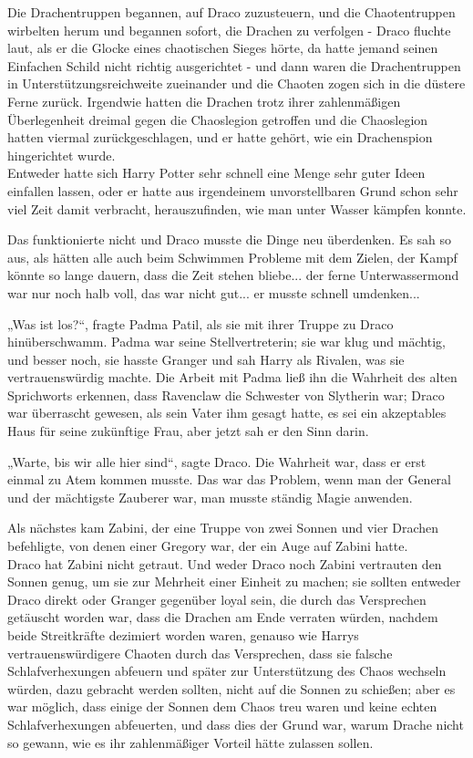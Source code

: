 {Die Drachentruppen begannen, auf Draco zuzusteuern, und die Chaotentruppen wirbelten herum und begannen sofort, die Drachen zu verfolgen - Draco fluchte laut, als er die Glocke eines chaotischen Sieges hörte, da hatte jemand seinen Einfachen Schild nicht richtig ausgerichtet - und dann waren die Drachentruppen in Unterstützungsreichweite zueinander und die Chaoten zogen sich in die düstere Ferne zurück. Irgendwie hatten die Drachen trotz ihrer zahlenmäßigen Überlegenheit dreimal gegen die Chaoslegion getroffen und die Chaoslegion hatten viermal zurückgeschlagen, und er hatte gehört, wie ein Drachenspion hingerichtet wurde.\\ Entweder hatte sich Harry Potter sehr schnell eine Menge sehr guter Ideen einfallen lassen, oder er hatte aus irgendeinem unvorstellbaren Grund schon sehr viel Zeit damit verbracht, herauszufinden, wie man unter Wasser kämpfen konnte.

Das funktionierte nicht und Draco musste die Dinge neu überdenken. Es sah so aus, als hätten alle auch beim Schwimmen Probleme mit dem Zielen, der Kampf könnte so lange dauern, dass die Zeit stehen bliebe... der ferne Unterwassermond war nur noch halb voll, das war nicht gut... er musste schnell umdenken...

„Was ist los?“, fragte Padma Patil, als sie mit ihrer Truppe zu Draco hinüberschwamm. Padma war seine Stellvertreterin; sie war klug und mächtig, und besser noch, sie hasste Granger und sah Harry als Rivalen, was sie vertrauenswürdig machte. Die Arbeit mit Padma ließ ihn die Wahrheit des alten Sprichworts erkennen, dass Ravenclaw die Schwester von Slytherin war; Draco war überrascht gewesen, als sein Vater ihm gesagt hatte, es sei ein akzeptables Haus für seine zukünftige Frau, aber jetzt sah er den Sinn darin.

„Warte, bis wir alle hier sind“, sagte Draco. Die Wahrheit war, dass er erst einmal zu Atem kommen musste. Das war das Problem, wenn man der General und der mächtigste Zauberer war, man musste ständig Magie anwenden.

Als nächstes kam Zabini, der eine Truppe von zwei Sonnen und vier Drachen befehligte, von denen einer Gregory war, der ein Auge auf Zabini hatte.\\ Draco hat Zabini nicht getraut. Und weder Draco noch Zabini vertrauten den Sonnen genug, um sie zur Mehrheit einer Einheit zu machen; sie sollten entweder Draco direkt oder Granger gegenüber loyal sein, die durch das Versprechen getäuscht worden war, dass die Drachen am Ende verraten würden, nachdem beide Streitkräfte dezimiert worden waren, genauso wie Harrys vertrauenswürdigere Chaoten durch das Versprechen, dass sie falsche Schlafverhexungen abfeuern und später zur Unterstützung des Chaos wechseln würden, dazu gebracht werden sollten, nicht auf die Sonnen zu schießen; aber es war möglich, dass einige der Sonnen dem Chaos treu waren und keine echten Schlafverhexungen abfeuerten, und dass dies der Grund war, warum Drache nicht so gewann, wie es ihr zahlenmäßiger Vorteil hätte zulassen sollen.

}
